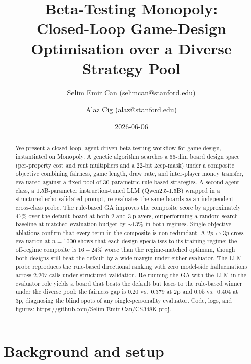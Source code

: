 \documentclass[10pt]{article}
\title{Beta-Testing Monopoly: \\Closed-Loop Game-Design Optimisation
       over a Diverse Strategy Pool}
\author{Selim Emir Can (selimcan@stanford.edu) \and Alaz Cig (alaz@stanford.edu)}
\date{2026-06-06}
\begin{document}
\maketitle

\begin{abstract}
We present a closed-loop, agent-driven beta-testing workflow for game
design, instantiated on Monopoly. A genetic algorithm searches a 66-dim
board design space (per-property cost and rent multipliers and a 22-bit
keep-mask) under a composite objective combining fairness, game length,
draw rate, and inter-player money transfer, evaluated against a fixed
pool of 30 parametric rule-based strategies. A second agent class, a
1.5B-parameter instruction-tuned LLM (Qwen2.5-1.5B) wrapped in a
structured echo-validated prompt, re-evaluates the same boards as an
independent cross-class probe. The rule-based GA improves the composite
score by approximately $47\%$ over the default board at both 2 and
3 players, outperforming a random-search baseline at matched
evaluation budget by $\sim 13\%$ in both regimes. Single-objective ablations confirm that every term in the
composite is non-redundant. A $2p\!\leftrightarrow\!3p$
cross-evaluation at $n{=}1000$ shows that each design specialises
to its training regime: the off-regime composite is $16\!-\!24\%$
worse than the regime-matched optimum, though both designs still
beat the default by a wide margin under either evaluator.
The LLM probe reproduces the rule-based directional ranking with zero
model-side hallucinations across 2{,}207 calls under structured
validation. Re-running the GA with the LLM in the evaluator role yields
a board that beats the default but loses to the rule-based winner under
the diverse pool: the fairness gap is $0.20$ vs.\ $0.379$ at 2p and
$0.05$ vs.\ $0.404$ at 3p, diagnosing the blind spots of any
single-personality evaluator. Code, logs, and figures:
\url{https://github.com/Selim-Emir-Can/CS348K-proj}.
\end{abstract}

\section{Background and setup}\label{sec:bg}
\end{document}
